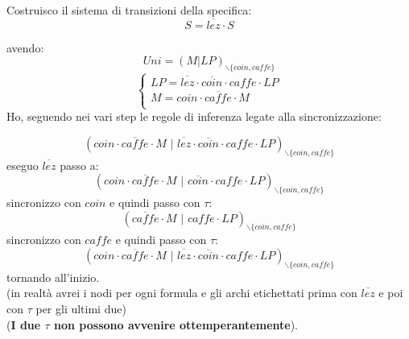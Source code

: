 \begin{esempio}
  Costruisco il sistema di transizioni della specifica:
  \[S=\overline{lez}\cdot S\]
  \begin{center}
  \end{center}
  avendo:
  \[Uni=(M|LP)_{\backslash\{ coin, caffe\}}\]
  \[
\begin{cases} 
    LP = \overline{lez}\cdot\overline{coin}\cdot caffe\cdot LP\\
    M = coin\cdot \overline{caffe}\cdot M\\
\end{cases}
\]
  Ho, seguendo nei vari step le regole di inferenza legate alla
  sincronizzazione:
  
  \[(coin\cdot \overline{caffe}\cdot
    M\,\,|\,\,\overline{lez}\cdot\overline{coin}\cdot caffe\cdot
    LP)_{\backslash\{ coin, caffe\}}\]
  eseguo $\overline{lez}$ passo a:
  \[(coin\cdot \overline{caffe}\cdot
    M\,\,|\,\,\overline{coin}\cdot caffe\cdot
    LP)_{\backslash\{ coin, caffe\}}\]
  sincronizzo con $coin$ e quindi passo con $\tau$:
  \[(\overline{caffe}\cdot
    M\,\,|\,\, caffe\cdot
    LP)_{\backslash\{ coin, caffe\}}\]
  sincronizzo con $caffe$ e quindi passo con $\tau$:
   \[(coin\cdot \overline{caffe}\cdot
    M\,\,|\,\,\overline{lez}\cdot\overline{coin}\cdot caffe\cdot
    LP)_{\backslash\{ coin, caffe\}}\]
  tornando all'inizio.\\
  (in realtà avrei i nodi per ogni formula e gli archi etichettati prima con
  $\overline{lez}$ e poi con $\tau$ per gli ultimi due)\\
  (\textbf{I due $\tau$ non possono avvenire ottemperantemente}).\\
\end{esempio}
